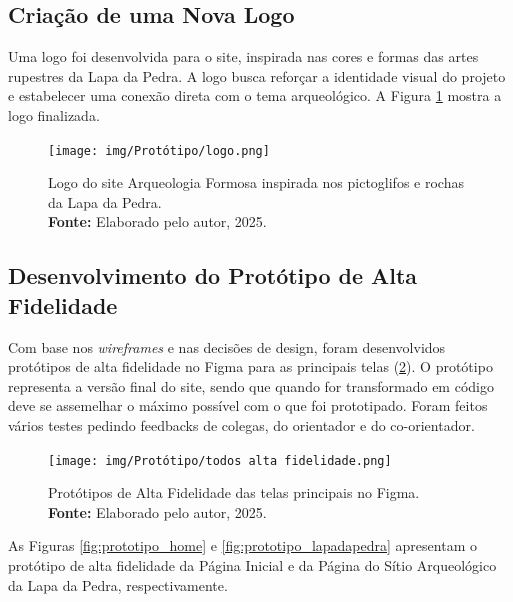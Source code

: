 \subsection{Criação de uma Nova Logo}
Uma logo foi desenvolvida para o site, inspirada nas cores e formas das artes rupestres da Lapa da Pedra. A logo busca reforçar a identidade visual do projeto e estabelecer uma conexão direta com o tema arqueológico. A Figura \ref{fig:logo_arqueologia_formosa} mostra a logo finalizada.
\begin{figure}[H]
    \centering
    \texttt{[image: img/Protótipo/logo.png]}
    \caption{ Logo do site Arqueologia Formosa inspirada nos pictoglifos e rochas da Lapa da Pedra. \\
        \textbf{Fonte:} Elaborado pelo autor, 2025.}
    \label{fig:logo_arqueologia_formosa}
\end{figure}


\subsection{Desenvolvimento do Protótipo de Alta Fidelidade}
Com base nos \textit{wireframes} e nas decisões de design, foram desenvolvidos protótipos de alta fidelidade no Figma para as principais telas (\ref{fig:prototipos_alta_fidelidade}). O protótipo representa a versão final do site, sendo que quando for transformado em código deve se assemelhar o máximo possível com o que foi prototipado. Foram feitos vários testes pedindo feedbacks de colegas, do orientador e do co-orientador. 

\begin{figure}[H]
    \centering
    \texttt{[image: img/Protótipo/todos alta fidelidade.png]}
    \caption{ Protótipos de Alta Fidelidade das telas principais no Figma. \\
        \textbf{Fonte:} Elaborado pelo autor, 2025.}
    \label{fig:prototipos_alta_fidelidade}
\end{figure}

As Figuras \ref{fig:prototipo_home} e \ref{fig:prototipo_lapadapedra} apresentam o protótipo de alta fidelidade da Página Inicial e da Página do Sítio Arqueológico da Lapa da Pedra, respectivamente. 

